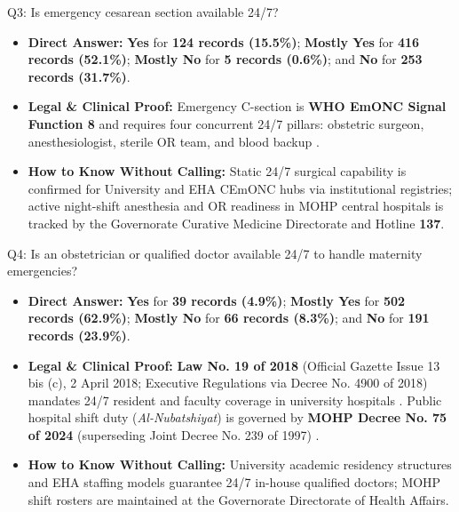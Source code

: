 \documentclass[10pt,a4paper]{article}
\begin{document}
\begin{qabox}{Q3: Is emergency cesarean section available 24/7?}
\begin{itemize}
    \item \textbf{Direct Answer:} \textbf{Yes} for \textbf{124 records (15.5\%)}; \textbf{Mostly Yes} for \textbf{416 records (52.1\%)}; \textbf{Mostly No} for \textbf{5 records (0.6\%)}; and \textbf{No} for \textbf{253 records (31.7\%)}.
    \item \textbf{Legal \& Clinical Proof:} Emergency C-section is \textbf{WHO EmONC Signal Function 8} \cite{who2009emonc} and requires four concurrent 24/7 pillars: obstetric surgeon, anesthesiologist, sterile OR team, and blood backup \cite{gahar2021hospital,egypt_law_51_1981_153_2004}.
    \item \textbf{How to Know Without Calling:} Static 24/7 surgical capability is confirmed for University and EHA CEmONC hubs via institutional registries; active night-shift anesthesia and OR readiness in MOHP central hospitals is tracked by the Governorate Curative Medicine Directorate and Hotline \textbf{137}.
\end{itemize}
\end{qabox}

\begin{qabox}{Q4: Is an obstetrician or qualified doctor available 24/7 to handle maternity emergencies?}
\begin{itemize}
    \item \textbf{Direct Answer:} \textbf{Yes} for \textbf{39 records (4.9\%)}; \textbf{Mostly Yes} for \textbf{502 records (62.9\%)}; \textbf{Mostly No} for \textbf{66 records (8.3\%)}; and \textbf{No} for \textbf{191 records (23.9\%)}.
    \item \textbf{Legal \& Clinical Proof:} \textbf{Law No. 19 of 2018} (Official Gazette Issue 13 bis (c), 2 April 2018; Executive Regulations via Decree No. 4900 of 2018) mandates 24/7 resident and faculty coverage in university hospitals \cite{egypt_law_19_2018_univ}. Public hospital shift duty (\textit{Al-Nubatshiyat}) is governed by \textbf{MOHP Decree No. 75 of 2024} (superseding Joint Decree No. 239 of 1997) \cite{egypt_mohp_decree_75_2024}.
    \item \textbf{How to Know Without Calling:} University academic residency structures and EHA staffing models guarantee 24/7 in-house qualified doctors; MOHP shift rosters are maintained at the Governorate Directorate of Health Affairs.
\end{itemize}
\end{qabox}
\end{document}
